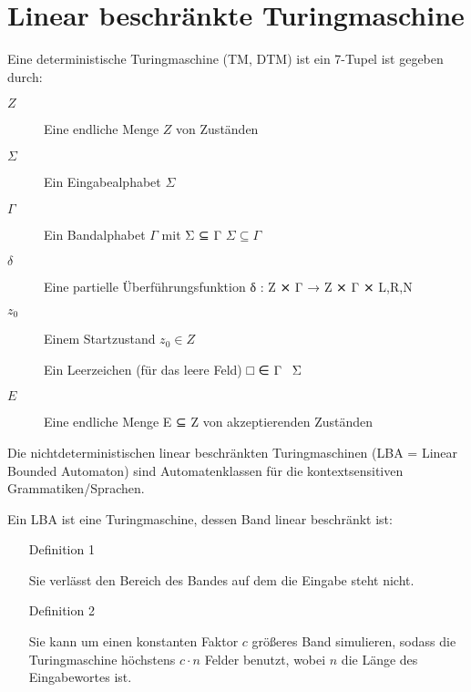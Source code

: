 \documentclass{lehramt-informatik-haupt}
\begin{document}

\chapter{Linear beschränkte Turingmaschine}

\begin{liQuellen}
\item \cite[Seite 312-317]{hoffmann}
\item \cite{wiki:turingmaschine}
\end{liQuellen}

Eine deterministische Turingmaschine (TM, DTM) ist ein 7-Tupel
\liTuringMaschine{} ist gegeben durch:

\begin{description}
\item[$Z$]
Eine endliche Menge $Z$ von Zuständen

\item[$\Sigma$]
Ein Eingabealphabet $\Sigma$

\item[$\Gamma$]
Ein Bandalphabet $\Gamma$ mit Σ ⊆ Γ $\Sigma \subseteq\Gamma$

\item[$\delta$]
Eine partielle Überführungsfunktion
δ : Z ⨯ Γ → Z ⨯ Γ ⨯ {L,R,N}

\item[$z_0$]
Einem Startzustand $z_0 \in Z$

\item[\liTuringLeerzeichen]
Ein Leerzeichen (für das leere Feld) □ ∈ Γ \ Σ

\item[$E$]
Eine endliche Menge E ⊆ Z von
akzeptierenden Zuständen
\end{description}

Die nichtdeterministischen linear beschränkten Turingmaschinen
(LBA = Linear Bounded Automaton) sind Automatenklassen für die
kontextsensitiven Grammatiken/Sprachen.

Ein LBA ist eine Turingmaschine, dessen Band linear beschränkt ist:

\begin{itemize}
\item[Definition 1]

Sie verlässt den Bereich des Bandes auf dem die Eingabe steht nicht.

\item[Definition 2]

Sie kann um einen konstanten Faktor $c$ größeres Band simulieren, sodass
die Turingmaschine höchstens $c \cdot n$ Felder benutzt, wobei $n$ die
Länge des Eingabewortes ist.
\end{itemize}
\end{document}
